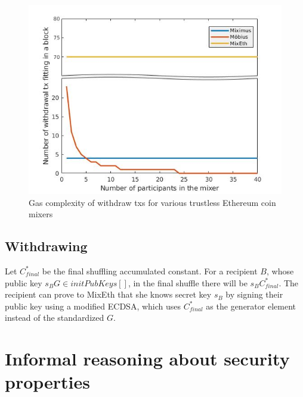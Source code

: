 \documentclass[a4paper]{article}
\theoremstyle{definition}
\begin{document}
\begin{figure}
	\centering
	\includegraphics[scale=0.5]{./withdrawalComplexity.jpg}
	\captionsetup{justification=centering}
	\caption{Gas complexity of withdraw txs for various trustless Ethereum coin mixers}
\end{figure} 

\subsection{Withdrawing}
Let $C^*_{final}$ be the final shuffling accumulated constant. For a recipient $B$, whose public key $s_{B}G \in initPubKeys[]$, in the final shuffle there will be $s_{B}C^*_{final}$. The recipient can prove to MixEth that she knows secret key $s_{B}$ by signing their public key using a modified ECDSA, which uses $C^*_{final}$ as the generator element instead of the standardized $G$.

\section{Informal reasoning about security properties}
\end{document}
